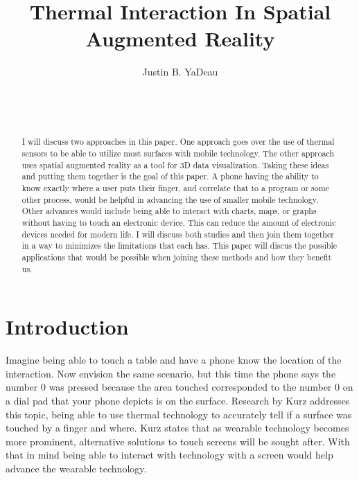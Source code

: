 \documentclass{sig-alternate}
\begin{document}

\title{Thermal Interaction In Spatial Augmented Reality}


\author{
\alignauthor
Justin B. YaDeau\\
	\\
	\\
	\\
}

\maketitle

\begin{abstract}
I will discuss two approaches in this paper. One approach goes over the use of thermal sensors to be able to utilize most surfaces with mobile technology. The other approach uses spatial augmented reality as a tool for 3D data visualization. Taking these ideas and putting them together is the goal of this paper. A phone having the ability to know exactly where a user puts their finger, and correlate that to a program or some other process, would be helpful in advancing the use of smaller mobile technology. Other advances would include being able to interact with charts, maps, or graphs without having to touch an electronic device. This can reduce the amount of electronic devices needed for modern life. I will discuss both studies and then join them together in a way to minimizes the limitations that each has. This paper will discus the possible applications that would be possible when joining these methods and how they benefit us.
\end{abstract}


\section{Introduction}
\label{sec:Introduction}
Imagine being able to touch a table and have a phone know the location of the interaction. Now envision the same scenario, but this time the phone says the number 0 was pressed because the area touched corresponded to the number 0 on a dial pad that your phone depicts is on the surface. Research by Kurz \cite{Thermal} addresses this topic, being able to use thermal technology to accurately tell if a surface was touched by a finger and where. Kurz \cite{Thermal} states that as wearable technology becomes more prominent, alternative solutions to touch screens will be sought after. With that in mind being able to interact with technology with a screen would help advance the wearable technology.    
\end{document}
